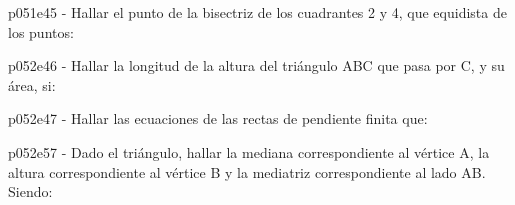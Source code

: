 \documentclass[spanish, 11pt]{exam}
\begin{document}
\begin{questions}
\begin{multicols}{1}
\begin{parts}
        \end{parts}
        \end{multicols}
        \question p051e45 - Hallar el punto de la bisectriz de los cuadrantes 2 y 4, que equidista de los puntos:
        \begin{multicols}{1} 
        \end{multicols}
        \question p052e46 - Hallar la longitud de la altura del triángulo ABC que pasa por C, y su área, si:
        \begin{multicols}{1} 
        \end{multicols}
        \question p052e47 - Hallar las ecuaciones de las rectas de pendiente finita que:
        \begin{multicols}{1} 
        \end{multicols}
        \question p052e57 - Dado el triángulo, hallar la mediana correspondiente al vértice A, la altura correspondiente al vértice B y la mediatriz correspondiente al lado AB. Siendo:
        \begin{multicols}{1} 

\end{multicols}
\end{questions}
\end{document}
